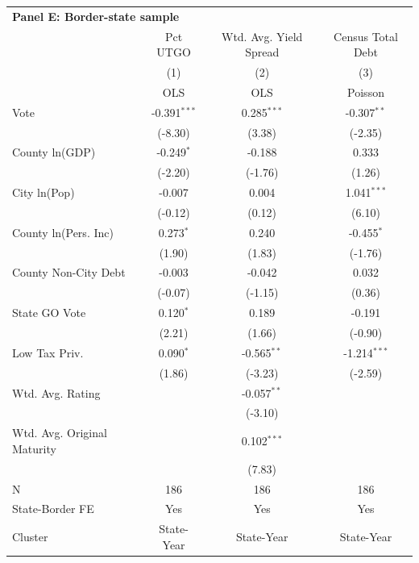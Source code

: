\begingroup
\centering
\begin{tabular*}{\textwidth}{@{\extracolsep{\fill}}lccc}
\multicolumn{4}{l}{\textbf{Panel E: Border-state sample}}\\

\addlinespace
   \toprule
                               & Pct UTGO       & Wtd. Avg. Yield Spread & Census Total Debt\\  
                               & (1)            & (2)                    & (3)\\  
                               &  OLS           & OLS                    & Poisson\\  
   \midrule 
   Vote                        & -0.391$^{***}$ & 0.285$^{***}$          & -0.307$^{**}$\\   
                               & (-8.30)       & (3.38)                & (-2.35)\\   
   County ln(GDP)              & -0.249$^{*}$   & -0.188                 & 0.333\\   
                               & (-2.20)       & (-1.76)               & (1.26)\\   
   City ln(Pop)                & -0.007         & 0.004                  & 1.041$^{***}$\\   
                               & (-0.12)       & (0.12)                & (6.10)\\   
   County ln(Pers. Inc)        & 0.273$^{*}$    & 0.240                  & -0.455$^{*}$\\   
                               & (1.90)        & (1.83)                & (-1.76)\\   
   County Non-City Debt        & -0.003         & -0.042                 & 0.032\\   
                               & (-0.07)       & (-1.15)               & (0.36)\\   
   State GO Vote               & 0.120$^{*}$    & 0.189                  & -0.191\\   
                               & (2.21)        & (1.66)                & (-0.90)\\   
   Low Tax Priv.               & 0.090$^{*}$    & -0.565$^{**}$          & -1.214$^{***}$\\   
                               & (1.86)        & (-3.23)               & (-2.59)\\   
   Wtd. Avg. Rating            &                & -0.057$^{**}$          &   \\   
                               &                & (-3.10)               &   \\   
   Wtd. Avg. Original Maturity &                & 0.102$^{***}$          &   \\   
                               &                & (7.83)                &   \\   
   \hline
   N                & 186            & 186                    & 186\\  
   State-Border FE             & Yes            & Yes                    & Yes\\  
   Cluster              & State-Year & State-Year & State-Year\\  
   \bottomrule
\end{tabular*}
\par\endgroup
